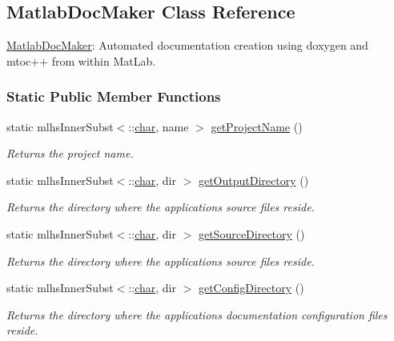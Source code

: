 \hypertarget{class_matlab_doc_maker}{}\subsection{Matlab\+Doc\+Maker Class Reference}
\label{class_matlab_doc_maker}


\hyperlink{class_matlab_doc_maker}{Matlab\+Doc\+Maker}\+: Automated documentation creation using doxygen and mtoc++ from within Mat\+Lab.  


\subsubsection*{Static Public Member Functions}
\begin{DoxyCompactItemize}
\item 
static mlhs\+Inner\+Subst$<$\+::\hyperlink{classchar}{char}, name $>$ \hyperlink{class_matlab_doc_maker_a9f84ff8d3f39824b54626862780b342c}{get\+Project\+Name} ()
\begin{DoxyCompactList}\small\item\em Returns the project name. \end{DoxyCompactList}\item 
static mlhs\+Inner\+Subst$<$\+::\hyperlink{classchar}{char}, dir $>$ \hyperlink{class_matlab_doc_maker_a1957c12ff4fb6a9d8e1b009961a5f499}{get\+Output\+Directory} ()
\begin{DoxyCompactList}\small\item\em Returns the directory where the applications source files reside. \end{DoxyCompactList}\item 
static mlhs\+Inner\+Subst$<$\+::\hyperlink{classchar}{char}, dir $>$ \hyperlink{class_matlab_doc_maker_a1481c6e95be338b758ec97b8090ee7c9}{get\+Source\+Directory} ()
\begin{DoxyCompactList}\small\item\em Returns the directory where the applications source files reside. \end{DoxyCompactList}\item 
static mlhs\+Inner\+Subst$<$\+::\hyperlink{classchar}{char}, dir $>$ \hyperlink{class_matlab_doc_maker_a11a2a8ec616df969a911b325e39b0b4f}{get\+Config\+Directory} ()
\begin{DoxyCompactList}\small\item\em Returns the directory where the applications documentation configuration files reside. \end{DoxyCompactList}\item 

\end{DoxyCompactItemize}
